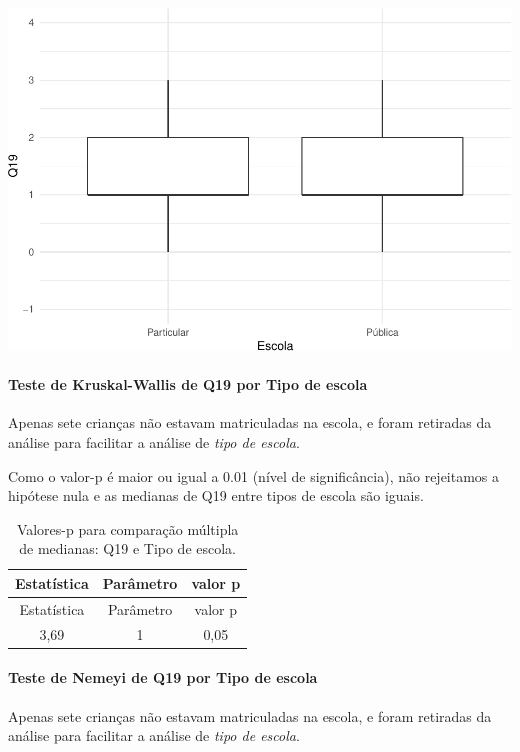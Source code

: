 \documentclass[]{article}
\let\oldparagraph\paragraph
\renewcommand{\paragraph}[1]{\oldparagraph{#1}\mbox{}}
\begin{document}
\begin{center}\includegraphics[width=0.75\linewidth]{relatorio_covid19_files/figure-latex/unnamed-chunk-353-1} \end{center}

\hypertarget{teste-de-kruskal-wallis-de-q19-por-tipo-de-escola}{%
\paragraph{Teste de Kruskal-Wallis de Q19 por Tipo de escola}\label{teste-de-kruskal-wallis-de-q19-por-tipo-de-escola}}

Apenas sete crianças não estavam matriculadas na escola, e foram retiradas da análise para facilitar a análise de \emph{tipo de escola}.

Como o valor-p é maior ou igual a 0.01 (nível de significância), não rejeitamos a hipótese nula e as medianas de Q19 entre tipos de escola são iguais.

\begin{longtable}[]{@{}ccc@{}}
\caption{\label{tab:unnamed-chunk-355}Valores-p para comparação múltipla de medianas: Q19 e Tipo de escola.}\tabularnewline
\toprule
Estatística & Parâmetro & valor p\tabularnewline
\midrule
\endfirsthead
\toprule
Estatística & Parâmetro & valor p\tabularnewline
\midrule
\endhead
3,69 & 1 & 0,05\tabularnewline
\bottomrule
\end{longtable}

\hypertarget{teste-de-nemeyi-de-q19-por-tipo-de-escola}{%
\paragraph{Teste de Nemeyi de Q19 por Tipo de escola}\label{teste-de-nemeyi-de-q19-por-tipo-de-escola}}

Apenas sete crianças não estavam matriculadas na escola, e foram retiradas da análise para facilitar a análise de \emph{tipo de escola}.
\end{document}
